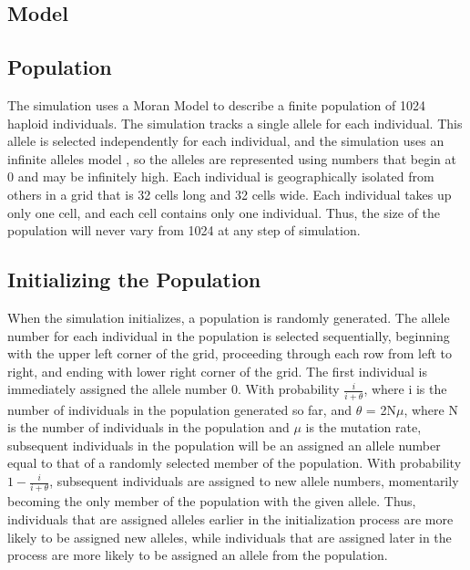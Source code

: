 \documentclass[12pt]{article}
\begin{document}
\begin{spacing}{1.5}
\section{Model}

\subsection{Population}
The simulation uses a Moran Model \cite{moran} to describe a finite population of 1024 haploid individuals. The simulation tracks a single allele for each individual. This allele is selected independently for each individual, and the simulation uses an infinite alleles model \cite{moran}, so the alleles are represented using numbers that begin at 0 and may be infinitely high. Each individual is geographically isolated from others in a grid that is 32 cells long and 32 cells wide. Each individual takes up only one cell, and each cell contains only one individual. Thus, the size of the population will never vary from 1024 at any step of simulation.

\subsection{Initializing the Population}
When the simulation initializes, a population is randomly generated. The allele number for each individual in the population is selected sequentially, beginning with the upper left corner of the grid, proceeding through each row from left to right, and ending with lower right corner of the grid. The first individual is immediately assigned the allele number 0. With probability $\displaystyle \frac {i}{i + \theta}$, where i is the number of individuals in the population generated so far, and $\theta$ = 2N$\mu$, where N is the number of individuals in the population and $\mu$ is the mutation rate, subsequent individuals in the population will be an assigned an allele number equal to that of a randomly selected member of the population. With probability $\displaystyle 1 - \frac{i}{i + \theta}$, subsequent individuals are assigned to new allele numbers, momentarily becoming the only member of the population with the given allele. Thus, individuals that are assigned alleles earlier in the initialization process are more likely to be assigned new alleles, while individuals that are assigned later in the process are more likely to be assigned an allele from the population.


\end{spacing}
\end{document}
